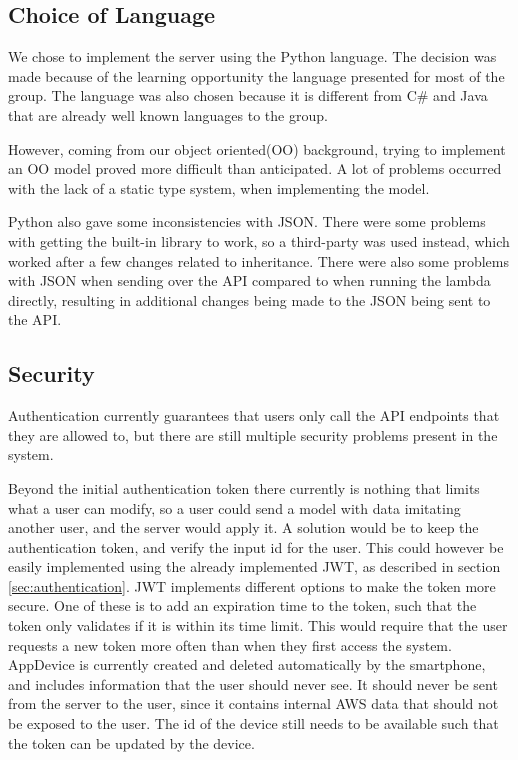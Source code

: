 \subsection{Choice of Language}
We chose to implement the server using the Python language. The decision was made because of the learning opportunity the language presented for most of the group. The language was also chosen because it is different from C\# and Java that are already well known languages to the group.

However, coming from our object oriented(OO) background, trying to implement an OO model proved more difficult than anticipated. A lot of problems occurred with the lack of a static type system, when implementing the model.

Python also gave some inconsistencies with JSON. There were some problems with getting the built-in library to work, so a third-party was used instead, which worked after a few changes related to inheritance. There were also some problems with JSON when sending over the API compared to when running the lambda directly, resulting in additional changes being made to the JSON being sent to the API.

\subsection{Security}\label{reflection:server:security}
Authentication currently guarantees that users only call the API endpoints that they are allowed to, but there are still multiple security problems present in the system.

Beyond the initial authentication token there currently is nothing that limits what a user can modify, so a user could send a model with data imitating another user, and the server would apply it. A solution would be to keep the authentication token, and verify the input id for the user. 
This could however be easily implemented using the already implemented JWT, as described in section \ref{sec:authentication}. JWT implements different options to make the token more secure. One of these is to add an expiration time to the token, such that the token only validates if it is within its time limit. This would require that the user requests a new token more often than when they first access the system.
AppDevice is currently created and deleted automatically by the smartphone, and includes information that the user should never see. It should never be sent from the server to the user, since it contains internal AWS data that should not be exposed to the user. The id of the device still needs to be available such that the token can be updated by the device.

